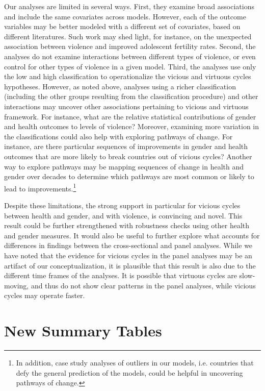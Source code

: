 \documentclass[12pt]{article}
\begin{document}
Our analyses are limited in several ways.
First, they examine broad associations and include the same covariates across models.
However, each of the outcome variables may be better modeled with a different set of covariates, based on different literatures.
Such work may shed light, for instance, on the unexpected association between violence and improved adolescent fertility rates.
Second, the analyses do not examine interactions between different types of violence, or even control for other types of violence in a given model.
Third, the analyses use only the low and high classification to operationalize the vicious and virtuous cycles hypotheses.
However, as noted above, analyses using a richer classification (including the other groups resulting from the classification procedure) and other interactions may uncover other associations pertaining to vicious and virtuous framework.
For instance, what are the relative statistical contributions of gender and health outcomes to levels of violence?
Moreover, examining more variation in the classifications could also help with exploring pathways of change. For instance, are there particular sequences of improvements in gender and health outcomes that are more likely to break countries out of vicious cycles?
Another way to explore pathways may be mapping sequences of change in health and gender over decades to determine which pathways are most common or likely to lead to improvements.\footnote{In addition, case study analyses of outliers in our models, i.e. countries that defy the general prediction of the models, could be helpful in uncovering pathways of change.}

Despite these limitations, the strong support in particular for vicious cycles between health and gender, and with violence, is convincing and novel.
This result could be further strengthened with robustness checks using other health and gender measures.
It would also be useful to further explore what accounts for differences in findings between the cross-sectional and panel analyses.
While we have noted that the evidence for vicious cycles in the panel analyses may be an artifact of our conceptualization, it is plausible that this result is also due to the different time frames of the analyses. It is possible that virtuous cycles are slow-moving, and thus do not show clear patterns in the panel analyses, while vicious cycles may operate faster.



\appendix

\section{New Summary Tables}
\end{document}
